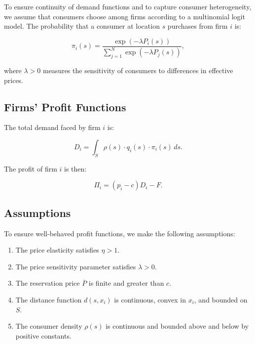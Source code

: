 To ensure continuity of demand functions and to capture consumer heterogeneity, we assume that consumers choose among firms according to a multinomial logit model. The probability that a consumer at location \( s \) purchases from firm \( i \) is:

\begin{equation}
\pi_i(s) = \frac{\exp\left( -\lambda P_i(s) \right)}{\sum_{j=1}^N \exp\left( -\lambda P_j(s) \right)},
\end{equation}

where \( \lambda > 0 \) measures the sensitivity of consumers to differences in effective prices.

\subsection{Firms' Profit Functions}

The total demand faced by firm \( i \) is:

\begin{equation}
D_i = \int_S \rho(s) \cdot q_i(s) \cdot \pi_i(s) \, ds.
\end{equation}

The profit of firm \( i \) is then:

\begin{equation}
\Pi_i = (p_i - c) D_i - F.
\end{equation}

\subsection{Assumptions}

To ensure well-behaved profit functions, we make the following assumptions:

\begin{enumerate}
    \item The price elasticity satisfies \( \eta > 1 \).
    \item The price sensitivity parameter satisfies \( \lambda > 0 \).
    \item The reservation price \( \overline{P} \) is finite and greater than \( c \).
    \item The distance function \( d(s, x_i) \) is continuous, convex in \( x_i \), and bounded on \( S \).
    \item The consumer density \( \rho(s) \) is continuous and bounded above and below by positive constants.
\end{enumerate}


